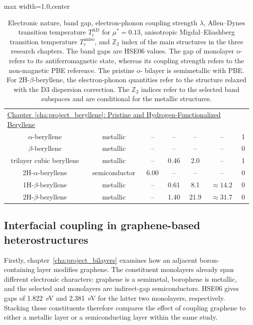 \begin{table}[!htbp]
\begin{adjustbox}{max width=1.0\linewidth,center}
\begin{tabular}{ccccccc}
\multicolumn{7}{l}{\hyperref[cha:project_beryllene]{Chapter~\ref*{cha:project_beryllene}: Pristine and Hydrogen-Functionalized Beryllene}} \\
$\alpha$-beryllene & metallic & -- & -- & -- & -- & 1 \\
\rowcolor{gray!15}
$\beta$-beryllene & metallic & -- & -- & -- & -- & 0 \\
trilayer cubic beryllene & metallic & -- & 0.46 & 2.0 & -- & 1 \\
\rowcolor{gray!15}
2H-$\alpha$-beryllene & semiconductor & 6.00 & -- & -- & -- & 0 \\
1H-$\beta$-beryllene & metallic & -- & 0.61 & 8.1 & $\approx 14.2$ & 0 \\
\rowcolor{gray!15}
2H-$\beta$-beryllene & metallic & -- & 1.40 & 21.9 & $\approx 31.7$ & 0 \\
\hline
\end{tabular}
\end{adjustbox}
\caption{Electronic nature, band gap, electron-phonon coupling strength $\lambda$,
Allen--Dynes transition temperature $T_\mathrm{c}^{\mathrm{AD}}$ for $\mu^*=0.13$,
anisotropic Migdal--Eliashberg transition temperature $T_\mathrm{c}^{\mathrm{aniso}}$,
and $\mathbb{Z}_2$ index of the main structures in the three research chapters.
The band gaps are HSE06 values.
The gap of monolayer o- refers to its antiferromagnetic state, whereas its coupling strength refers to the non-magnetic PBE reference.
The pristine o- bilayer is semimetallic with PBE.
For 2H-$\beta$-beryllene, the electron-phonon quantities refer to the structure relaxed with the D3 dispersion correction.
The $\mathbb{Z}_2$ indices refer to the selected band subspaces and are conditional for the metallic structures.}
\label{tab:conclusion_material_summary}
\end{table}

\subsection{Interfacial coupling in graphene-based heterostructures}

Firstly, chapter~\ref{cha:project_bilayers} examines how an adjacent boron-containing layer modifies graphene.
The constituent monolayers already span different electronic characters: graphene is a semimetal, borophene is metallic, and the selected  and  monolayers are indirect-gap semiconductors.
HSE06 gives gaps of \qty{1.822}{\electronvolt} and \qty{2.381}{\electronvolt} for the latter two monolayers, respectively.
Stacking these constituents therefore compares the effect of coupling graphene to either a metallic layer or a semiconducting layer within the same study.

